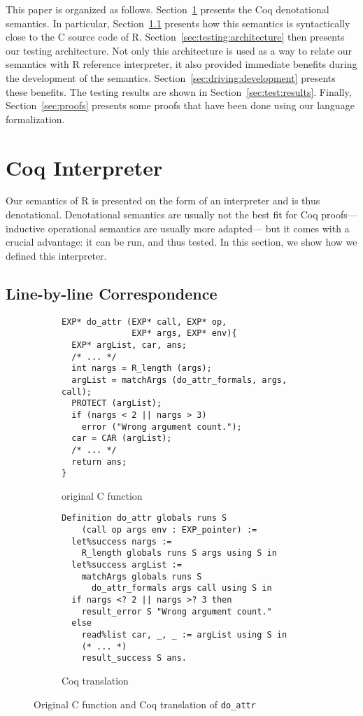 \documentclass[
    sigplan,
    10pt,
    review, %
    natbib=false %
 ]{acmart}
\newcommand\eti[1]{\todo[color=blue!20,inline]{#1}}
\begin{document}
\eti{update when paper is stable:}
This paper is organized as follows.
Section~\ref{sec:coq:interp} presents the Coq denotational semantics.
In particular, Section~\ref{sec:eyeball:closeness} presents
how this semantics is syntactically close to the C source code of R.
Section~\ref{sec:testing:architecture} then presents our testing architecture.
Not only this architecture is used as a way to relate our semantics
with R reference interpreter,
it also provided immediate benefits during the development of the semantics.
Section~\ref{sec:driving:development} presents these benefits.
The testing results are shown in Section~\ref{sec:test:results}.
Finally, Section~\ref{sec:proofs} presents some proofs that have been done
using our language formalization.

\section{Coq Interpreter}
\label{sec:coq:interp}

Our semantics of R is presented on the form of an interpreter
and is thus denotational.
Denotational semantics are usually not the best fit for Coq proofs---%
inductive operational semantics are usually more adapted---%
but it comes with a crucial advantage:
it can be run, and thus tested.
In this section, we show how we defined this interpreter.

\subsection{Line-by-line Correspondence}
\label{sec:eyeball:closeness}

\begin{figure*}
    \centering{}
\begin{subfigure}{.54\textwidth}
\begin{verbatim}
EXP* do_attr (EXP* call, EXP* op,
              EXP* args, EXP* env){
  EXP* argList, car, ans;
  /* ... */
  int nargs = R_length (args);
  argList = matchArgs (do_attr_formals, args, call);
  PROTECT (argList);
  if (nargs < 2 || nargs > 3)
    error ("Wrong argument count.");
  car = CAR (argList);
  /* ... */
  return ans;
}
\end{verbatim}
    \caption{original C function}
    \label{fig:c:do_attr}
\end{subfigure}
\begin{subfigure}{.45\textwidth}
\begin{verbatim}
Definition do_attr globals runs S
    (call op args env : EXP_pointer) :=
  let%success nargs :=
    R_length globals runs S args using S in
  let%success argList :=
    matchArgs globals runs S
      do_attr_formals args call using S in
  if nargs <? 2 || nargs >? 3 then
    result_error S "Wrong argument count."
  else
    read%list car, _, _ := argList using S in
    (* ... *)
    result_success S ans.
\end{verbatim}
    \caption{Coq translation}
    \label{fig:coq:do_attr}
\end{subfigure}
    \caption{Original C function and Coq translation of \texttt{do_attr}}
    \label{fig:do_attr}
\end{figure*}
\end{document}

